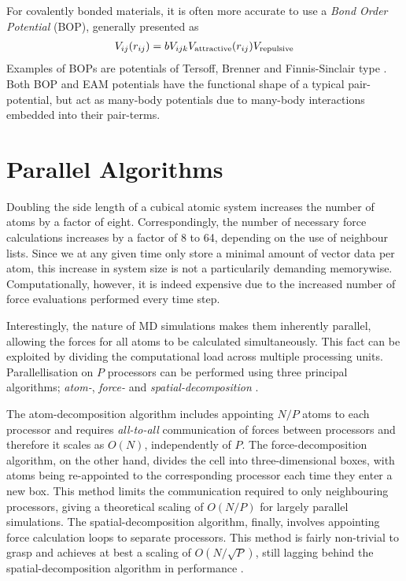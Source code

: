 For covalently bonded materials, it is often more accurate to use a \textit{Bond Order Potential} (BOP), generally presented as
\begin{align}
V_{ij}(r_{ij}) =bV_{ijk}V_{\rm attractive}(r_{ij}) V_ {\rm repulsive}
\end{align}
Examples of BOPs are potentials of Tersoff, Brenner and Finnis-Sinclair type \cite{tersoff1988new, brenner1990empirical, finnis1984simple}. Both BOP and EAM potentials have the functional shape of a typical pair-potential, but act as many-body potentials due to many-body interactions embedded into their pair-terms.

\section{Parallel Algorithms}
Doubling the side length of a cubical atomic system increases the number of atoms by a factor of eight. 
Correspondingly, the number of necessary force calculations increases by a factor of  8 to 64, depending on the use of neighbour lists.
Since we at any given time only store a minimal amount of vector data per atom, this increase in system size is not a particularily demanding memorywise.
Computationally, however, it is indeed expensive due to the increased number of force evaluations performed every time step.

Interestingly, the nature of MD simulations makes them inherently parallel, allowing the forces for all atoms to be calculated simultaneously. 
This fact can be exploited by dividing the computational load across multiple processing units. 
Parallellisation on $P$ processors can be performed using three principal algorithms; \textit{atom-}, \textit{force-} and \textit{spatial-decomposition} 
\cite{fincham1987parallel}.

The atom-decomposition algorithm includes appointing $N/P$ atoms to each processor and requires \textit{all-to-all} communication of forces between processors and therefore it scales as $O(N)$, independently of $P$. 
The force-decomposition algorithm, on the other hand, divides the cell into three-dimensional boxes, with atoms being re-appointed to the corresponding processor each time they enter a new box. 
This method limits the communication required to only neighbouring processors, giving a theoretical scaling of $O(N/P)$ for largely parallel simulations.
The spatial-decomposition algorithm, finally, involves appointing force calculation loops to separate processors.
This method is fairly non-trivial to grasp and achieves at best a scaling of $O(N/\sqrt{P})$, still lagging behind the spatial-decomposition algorithm in performance \cite{fincham1987parallel,lammpsMD}.
